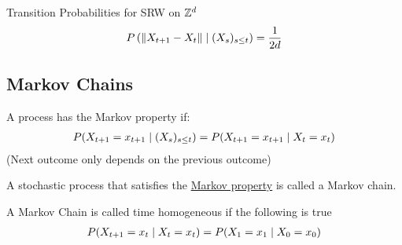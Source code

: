 \documentclass[12pt,a4paper]{article}
\begin{document}
\begin{example}{Transition Probabilities for SRW on $\mathbb{Z}^d$}
\begin{align*}
P\left(\norm{X_{t+1} - X_{t}} \;\vert\; (X_{s})_{s \leq t} \right) = \frac{1}{2d} 
\end{align*}
\end{example}
\newpage
\subsection{Markov Chains}
\begin{defn}
\label{markovprop}
A process has the Markov property if:
\begin{align*}
P(X_{t+1}= x_{t+1} \;\vert\; (X_{s})_{s\leq t}) = P(X_{t+1} = x_{t+1} \;\vert\; X_{t} = x_t)
\end{align*}
(Next outcome only depends on the previous outcome)
\end{defn}

\begin{note}
A stochastic process that satisfies the \hyperref[markovprop]{Markov property} is called a Markov chain.
\end{note}

\begin{defn}
A Markov Chain is called time homogeneous if the following is true
\begin{align*}
P(X_{t+1} = x_t \;\vert\; X_t = x_t) = P(X_1 = x_1 \;\vert\; X_0 = x_0)
\end{align*}
\end{defn}
\end{document}
